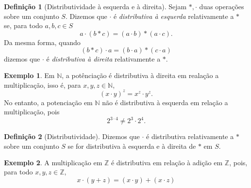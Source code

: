 \documentclass[a4paper,12pt]{article}
\theoremstyle{plain}
\theoremstyle{definition}
\newtheorem{definicao}{Definição}[section]
\newtheorem{exemplo}{Exemplo}[section]
\begin{document}
\begin{definicao}[Distributividade à esquerda e à direita]
	Sejam $*,\cdot$ duas operações sobre um conjunto $S$. Dizemos que $\cdot$ é \emph{distributiva à esquerda} relativamente a $*$ se, para todo $a,b,c\in S$
	$$a\cdot(b*c) = (a\cdot b)*(a\cdot c).$$
	Da mesma forma, quando $$(b*c)\cdot a = (b\cdot a)*(c\cdot a)$$ dizemos que $\cdot$ é \emph{distributiva à direita} relativamente a $*$.
\end{definicao}

\begin{exemplo}
	Em $\mathbb{N}$, a potênciação é distributiva à direita em realação a multiplicação, isso é, para $x,y,z \in \mathbb{N}$, $$(x\cdot y)^z = x^z\cdot y^z.$$
	No entanto, a potenciação em $\mathbb{N}$ não é distributiva à esquerda em relação a multiplicação, pois $$2^{3\cdot 4} \neq 2^3\cdot 2^4.$$
\end{exemplo}

\begin{definicao}[Distributividade]
	Dizemos que $\cdot$ é distributiva relativamente a $*$ sobre um conjunto $S$ se for distributiva à esquerda e à direita de $*$ em $S$. 
\end{definicao}

\begin{exemplo}
	A multiplicação em $\mathbb{Z}$ é distributiva em relação à adição em $\mathbb{Z}$, pois, para todo $x,y,z \in \mathbb{Z}$, $$x\cdot(y+z) = (x\cdot y) + (x\cdot z)$$
\end{exemplo}


{}



\end{document}
